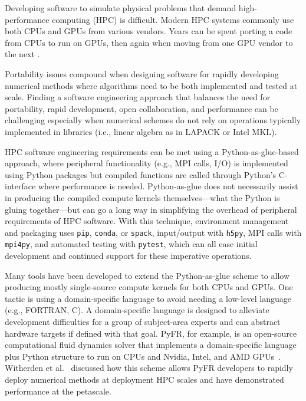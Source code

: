 Developing software to simulate physical problems that demand high- performance computing (HPC) is difficult.
Modern HPC systems commonly use both CPUs and GPUs from various vendors.
Years can be spent porting a code from CPUs to run on GPUs, then again when moving from one GPU vendor to the next \cite{pozulp_progress_2023}.

Portability issues compound when designing software for rapidly developing numerical methods where algorithms need to be both implemented and tested at scale.
Finding a software engineering approach that balances the need for portability, rapid development, open collaboration, and performance can be challenging especially when numerical schemes do not rely on operations typically implemented in libraries (i.e., linear algebra as in LAPACK or Intel MKL). 

HPC software engineering requirements can be met using a Python-as-glue-based approach, where peripheral functionality (e.g., MPI calls, I/O) is implemented using Python packages but compiled functions are called through Python's C-interface where performance is needed.
Python-as-glue does not necessarily assist in producing the compiled compute kernels themselves---what the Python is gluing together---but can go a long way in simplifying the overhead of peripheral requirements of HPC software.
With this technique, environment management and packaging uses \texttt{pip}, \texttt{conda}, or \texttt{spack}, input/output with \texttt{h5py}, MPI calls with \texttt{mpi4py}, 
and automated testing with \texttt{pytest}, which can all ease initial development and continued support for these imperative operations. 

Many tools have been developed to extend the Python-as-glue scheme to allow producing mostly single-source compute kernels for both CPUs and GPUs.
One tactic is using a domain-specific language to avoid needing a low-level language (e.g., FORTRAN, C).
A domain-specific language is designed to alleviate development difficulties for a group of subject-area experts and can abstract hardware targets if defined with that goal.
PyFR, for example, is an open-source computational fluid dynamics solver that implements a domain-specific language plus Python structure to run on CPUs and Nvidia, Intel, and AMD GPUs~\cite{pyfrPetascale}. 
Witherden et al.~\cite{pyfrPetascale} discussed how this scheme allows PyFR developers to rapidly deploy numerical methods at deployment HPC scales and have demonstrated performance at the petascale.

